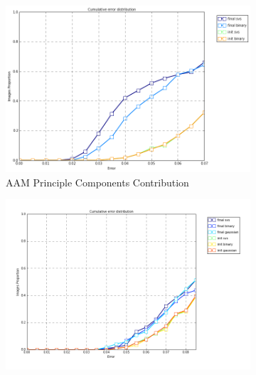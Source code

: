 \begin{figure}[h!]
    \centering
    \begin{subfigure}[b]{0.45\textwidth}
        \includegraphics[width=\textwidth]{resources/Fig_SVS/faces_svs_binary_gaussian}
        \caption{AAM Principle Components Contribution}
    \end{subfigure}
    \hfill
    \begin{subfigure}[b]{0.2\textwidth}
            \includegraphics[width=\textwidth]{resources/Fig_SVS/ears_svs_binary_gaussian}
    \end{subfigure}
    \\
    \begin{subfigure}[b]{0.2\textwidth}

\end{subfigure}
\end{figure}
